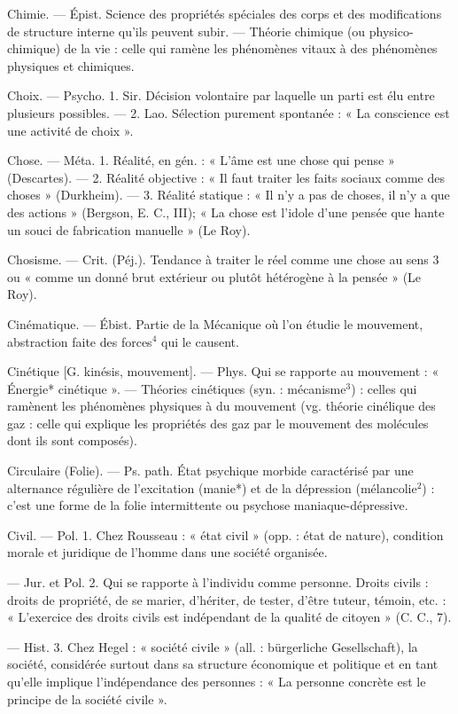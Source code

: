 Chimie. — Épist. Science des propriétés spéciales des corps et des
modifications de structure interne
qu'ils peuvent subir. — Théorie
chimique (ou physico-chimique) de
la vie : celle qui ramène les phénomènes vitaux à des phénomènes
physiques et chimiques.

Choix. — Psycho. 1. Sir. Décision volontaire par laquelle un parti est élu
entre plusieurs possibles. — 2. Lao.
Sélection purement spontanée :
« La conscience est une activité de
choix ».

Chose. — Méta. 1. Réalité, en gén. :
« L'âme est une chose qui pense »
(Descartes). — 2. Réalité objective :
« Il faut traiter les faits sociaux
comme des choses » (Durkheim). —
3. Réalité statique : « Il n’y a pas
de choses, il n’y a que des actions »
(Bergson, E. C., III); « La chose est
l’idole d’une pensée que hante un
souci de fabrication manuelle »
(Le Roy).

Chosisme. — Crit. (Péj.). Tendance à
traiter le réel comme une chose au
sens 3 ou « comme un donné brut
extérieur ou plutôt hétérogène à la
pensée » (Le Roy).

Cinématique. — Ébist. Partie de la
Mécanique où l’on étudie le mouvement, abstraction faite des forces$^4$
qui le causent.

Cinétique [G. kinésis, mouvement]. —
Phys. Qui se rapporte au mouvement : « Énergie* cinétique ». —
Théories cinétiques (syn. : mécanisme$^3$) : celles qui ramènent les
phénomènes physiques à du mouvement (vg. théorie cinélique des gaz :
celle qui explique les propriétés des
gaz par le mouvement des molécules
dont ils sont composés).

Circulaire (Folie). — Ps. path. État
psychique morbide caractérisé par
une alternance régulière de l’excitation (manie*) et de la dépression
(mélancolie$^2$) : c’est une forme de la
folie intermittente ou psychose maniaque-dépressive.

Civil. — Pol. 1. Chez Rousseau : « état
civil » (opp. : état de nature), condition morale et juridique de l’homme
dans une société organisée.

— Jur. et Pol. 2. Qui se rapporte
à l'individu comme personne. Droits
civils : droits de propriété, de se
marier, d’hériter, de tester, d’être
tuteur, témoin, etc. : « L'exercice
des droits civils est indépendant de
la qualité de citoyen » (C. C., 7).

— Hist. 3. Chez Hegel : « société
civile » (all. : bürgerliche Gesellschaft),
la société, considérée surtout dans
sa structure économique et politique
et en tant qu’elle implique l’indépendance des personnes : « La personne concrète est le principe de la
société civile ».

